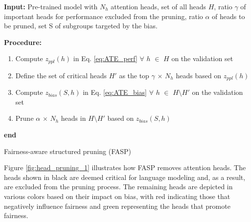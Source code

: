 \documentclass[letterpaper]{article} %
\begin{document}
\begin{algorithm}[H]
\textbf{Input:} Pre-trained model with $N_h$ attention heads, set of all heads $H$, ratio $\gamma$ of important heads for performance excluded from the pruning, ratio $\alpha$ of heads to be pruned, set S of subgroups targeted by the bias. 

{
\textbf{Procedure:}
\begin{enumerate}
\item Compute $z_{ppl}(h)$ in Eq. \eqref{eq:ATE_perf} $\forall$ $h$ $\in$ $H$ on the validation set
\item Define the set of critical heads  $H'$ as the top $\gamma$ $\times$ $N_h$ heads based on $z_{ppl}(h)$
\item Compute $z_{bias}(S,h)$ in Eq. \eqref{eq:ATE_bias} $\forall$ $h$ $\in$ $H\setminus H'$ {on the validation  set}
\item Prune $\alpha$ $\times$ $N_h$ heads in  $H\setminus H'$ based on $z_{bias}(S,h)$
\end{enumerate}

\textbf{end}}
\caption{Fairness-aware structured pruning (FASP)}
\end{algorithm}

Figure \ref{fig:head_pruning_1} illustrates how FASP removes attention heads. The heads shown in black are deemed critical for language modeling and, as a result, are excluded from the pruning process. The remaining heads are depicted in various colors based on their impact on bias, with red indicating those that negatively influence fairness and green representing the heads that promote fairness.
\end{document}

